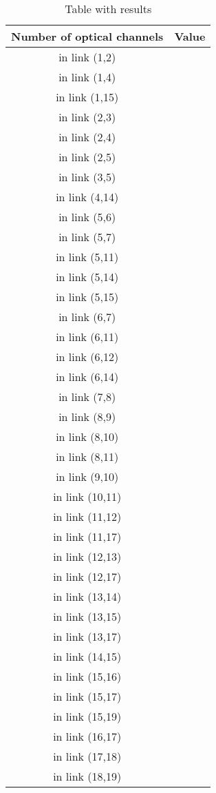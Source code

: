 \begin{table}[h!]
\centering
\begin{tabular}{|| c | c||}
 \hline
 Number of optical channels & Value \\
 \hline\hline
in link (1,2) &  \\
in link (1,4) &  \\
in link (1,15) &  \\
in link (2,3) &  \\
in link (2,4) &  \\
in link (2,5) &  \\
in link (3,5) &  \\
in link (4,14) &  \\
in link (5,6) &  \\
in link (5,7) &  \\
in link (5,11) &  \\
in link (5,14) &  \\
in link (5,15) &  \\
in link (6,7) &  \\
in link (6,11) &  \\
in link (6,12) &  \\
in link (6,14) &  \\
in link (7,8) &  \\
in link (8,9) &  \\
in link (8,10) &  \\
in link (8,11) &  \\
in link (9,10) &  \\
in link (10,11) &  \\
in link (11,12) &  \\
in link (11,17) &  \\
in link (12,13) &  \\
in link (12,17) &  \\
in link (13,14) &  \\
in link (13,15) &  \\
in link (13,17) &  \\
in link (14,15) &  \\
in link (15,16) &  \\
in link (15,17) &  \\
in link (15,19) &  \\
in link (16,17) &  \\
in link (17,18) &  \\
in link (18,19) &  \\
\hline
\end{tabular}
\caption{Table with results}
\label{result_ILP3_without}
\end{table}

